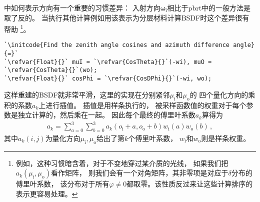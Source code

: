 中如何表示方向有一个重要的习惯差异：
入射方向${\bm\omega}_{\mathrm{i}}$相比于pbrt中的一般方法是取了反的。
当执行其他计算例如用该表示为分层材料计算BSDF时这个差异很有帮助
\footnote{例如，这种习惯暗含着，对于不变地穿过某介质的光线，
如果我们把$a_k(\mu_{\mathrm{i}},\mu_{\mathrm{o}})$看作矩阵，
则我们会有一个对角矩阵，其非零项是对应于$\delta$分布的傅里叶系数，
该分布对于所有$\varphi\ne0$都取零。该性质反过来让这些计算排序的表示更容易处理。}。
\begin{lstlisting}
`\initcode{Find the zenith angle cosines and azimuth difference angle}{=}`
`\refvar{Float}{}` muI = `\refvar{CosTheta}{}`(-wi), muO = `\refvar{CosTheta}{}`(wo);
`\refvar{Float}{}` cosPhi = `\refvar{CosDPhi}{}`(-wi, wo);
\end{lstlisting}
这样重建的BSDF就非常平滑，这里的实现在分别紧邻$\mu_{\mathrm{i}}$和$\mu_{\mathrm{o}}$的
四个量化方向的乘积的系数$a_k$上进行插值。
插值是用样条执行的，
被采样函数值的权重对于每个参数是独立计算的，然后乘在一起。
因此每个最终的傅里叶系数$a_k$算得为
\begin{align}\label{8.22}
    a_k=\sum\limits_{a=0}^{3}\sum\limits_{b=0}^{3}a_k(o_{\mathrm{i}}+a,o_{\mathrm{o}}+b)w_{\mathrm{i}}(a)w_{\mathrm{o}}(b)\, ,
\end{align}
其中$a_k(i,j)$为量化方向$\mu_{\mathrm{i}},\mu_{\mathrm{o}}$给出了第$k$个傅里叶系数，
$w_{\mathrm{i}}$和$w_{\mathrm{o}}$则是样条权重。